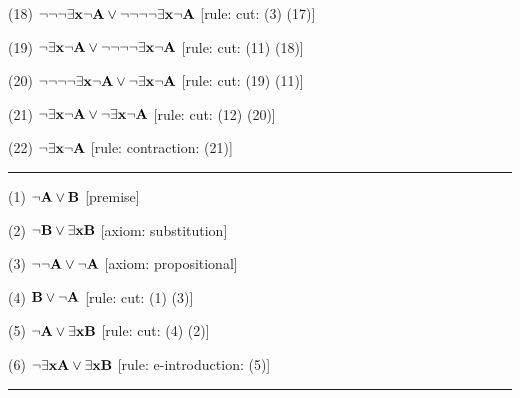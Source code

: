 \item{(18)} $\neg \neg \neg \exists {\bf x} \neg {\bf A} \lor \neg \neg \neg \neg \exists {\bf x} \neg {\bf A}$ \hfill [rule: cut: (3) (17)]
\item{(19)} $\neg \exists {\bf x} \neg {\bf A} \lor \neg \neg \neg \neg \exists {\bf x} \neg {\bf A}$ \hfill [rule: cut: (11) (18)]
\item{(20)} $\neg \neg \neg \neg \exists {\bf x} \neg {\bf A} \lor \neg \exists {\bf x} \neg {\bf A}$ \hfill [rule: cut: (19) (11)]
\item{(21)} $\neg \exists {\bf x} \neg {\bf A} \lor \neg \exists {\bf x} \neg {\bf A}$ \hfill [rule: cut: (12) (20)]
\item{(22)} $\neg \exists {\bf x} \neg {\bf A}$ \hfill [rule: contraction: (21)]
\medskip
\hrule
\medskip
\item{(1)} $\neg {\bf A} \lor {\bf B}$ \hfill [premise]
\item{(2)} $\neg {\bf B} \lor \exists {\bf x} {\bf B}$ \hfill [axiom: substitution]
\item{(3)} $\neg \neg {\bf A} \lor \neg {\bf A}$ \hfill [axiom: propositional]
\item{(4)} ${\bf B} \lor \neg {\bf A}$ \hfill [rule: cut: (1) (3)]
\item{(5)} $\neg {\bf A} \lor \exists {\bf x} {\bf B}$ \hfill [rule: cut: (4) (2)]
\item{(6)} $\neg \exists {\bf x} {\bf A} \lor \exists {\bf x} {\bf B}$ \hfill [rule: e-introduction: (5)]
\medskip
\hrule
\medskip

\vfill
\break

